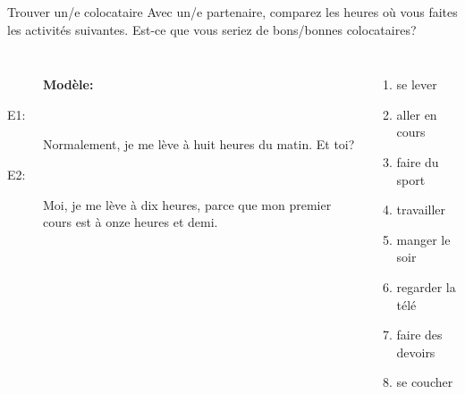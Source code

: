 \documentclass{beamer}
\begin{document}
  \begin{frame}{Trouver un/e colocataire}
    Avec un/e partenaire, comparez les heures où vous faites les activités suivantes.
    Est-ce que vous seriez de bons/bonnes colocataires? \\
    \begin{columns}
        \begin{description}
          \item[] \textbf{Modèle:}
          \item[] 
          \item[E1:] Normalement, je me lève à huit heures du matin. Et toi?
          \item[] 
          \item[E2:] Moi, je me lève à dix heures, parce que mon premier cours est à onze heures et demi.
          \item[] 
        \end{description}
        \small
        \begin{enumerate}
          \item se lever
          \item aller en cours
          \item faire du sport
          \item travailler
          \item manger le soir
          \item regarder la télé
          \item faire des devoirs
          \item se coucher
        \end{enumerate}
    \end{columns}
  \end{frame}
\end{document}
